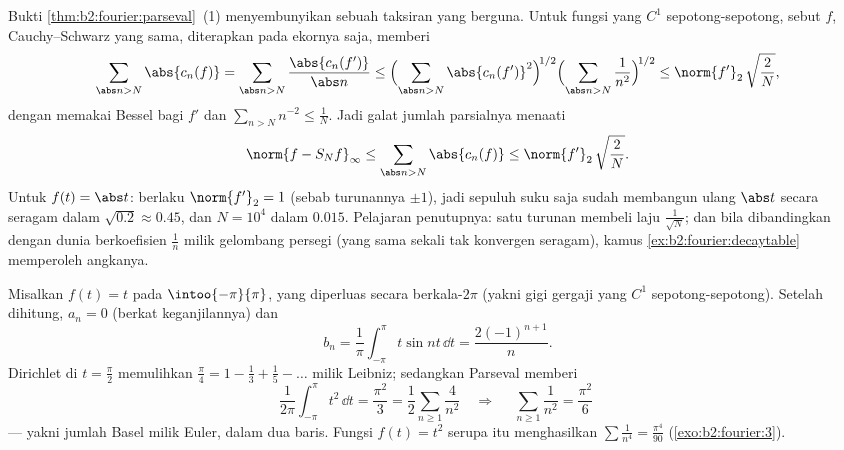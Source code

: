 \begin{example}\label{ex:b2:fourier:tailbound}
Bukti \cref{thm:b2:fourier:parseval}~(1) menyembunyikan sebuah taksiran
yang berguna. Untuk fungsi  yang $C^1$ sepotong-sepotong, sebut $f$,
Cauchy--Schwarz yang sama, diterapkan pada ekornya saja, memberi
\[
\sum_{\abs n > N}\abs{c_n(f)}
= \sum_{\abs n > N}\frac{\abs{c_n(f')}}{\abs n}
\leq \Bigl(\sum_{\abs n > N}\abs{c_n(f')}^2\Bigr)^{\!1/2}
\Bigl(\sum_{\abs n>N}\frac{1}{n^2}\Bigr)^{\!1/2}
\leq \norm{f'}_2\,\sqrt{\frac{2}{N}} ,
\]
dengan memakai Bessel bagi $f'$ dan $\sum_{n>N}n^{-2} \leq \frac1N$. Jadi
galat  jumlah parsialnya menaati
\[
\norm{f - S_Nf}_\infty
\leq \sum_{\abs n>N}\abs{c_n(f)}
\leq \norm{f'}_2\,\sqrt{\frac2N} .
\]
Untuk $f(t) = \abs t$: berlaku $\norm{f'}_2 = 1$ (sebab turunannya
$\pm1$), jadi sepuluh suku saja sudah membangun ulang $\abs t$ secara seragam
dalam $\sqrt{0.2} \approx 0.45$, dan $N = 10^4$ dalam
$0.015$. Pelajaran penutupnya: satu turunan membeli laju
 $\frac{1}{\sqrt N}$; dan bila dibandingkan dengan
dunia berkoefisien $\frac1n$ milik gelombang persegi (yang sama sekali tak
konvergen seragam), kamus
\cref{ex:b2:fourier:decaytable} memperoleh angkanya.
\end{example}

\begin{example}\label{ex:b2:fourier:basel}
Misalkan $f(t) = t$ pada $\intoo{-\pi}{\pi}$, yang diperluas secara
berkala-$2\pi$ (yakni gigi gergaji yang $C^1$ sepotong-sepotong). Setelah dihitung, $a_n = 0$ (berkat keganjilannya) dan
\[
b_n = \frac{1}{\pi}\int_{-\pi}^{\pi} t\sin nt\,\dd t
= \frac{2(-1)^{n+1}}{n} .
\]
Dirichlet di $t = \frac\pi2$ memulihkan $\frac\pi4 = 1 -
\frac13 + \frac15 - \dots$ milik Leibniz; sedangkan Parseval memberi
\[
\frac{1}{2\pi}\int_{-\pi}^{\pi} t^2\,\dd t = \frac{\pi^2}{3}
= \frac12\sum_{n\geq1}\frac{4}{n^2}
\quad\Longrightarrow\quad
\boxed{\;\sum_{n\geq1}\frac{1}{n^2} = \frac{\pi^2}{6}\;}
\]
--- yakni jumlah Basel milik Euler, dalam dua baris. Fungsi $f(t) = t^2$
serupa itu menghasilkan $\sum \frac1{n^4} = \frac{\pi^4}{90}$
(\cref{exo:b2:fourier:3}).
\end{example}

